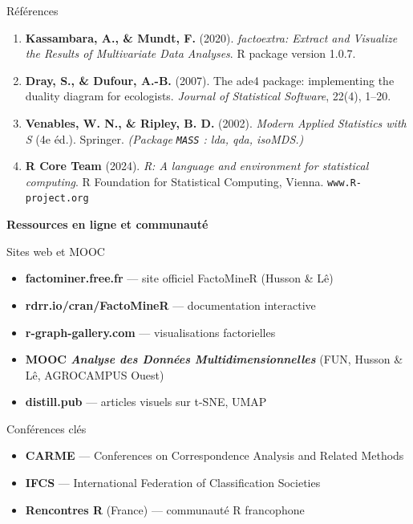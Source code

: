 \begin{frame}[allowframebreaks]{Références}
\begin{enumerate}
  \item \textbf{Kassambara, A., \& Mundt, F.} (2020).
        \textit{factoextra: Extract and Visualize the Results of Multivariate
        Data Analyses}. R package version 1.0.7.

  \item \textbf{Dray, S., \& Dufour, A.-B.} (2007).
        The ade4 package: implementing the duality diagram for ecologists.
        \textit{Journal of Statistical Software}, 22(4), 1--20.

  \item \textbf{Venables, W. N., \& Ripley, B. D.} (2002).
        \textit{Modern Applied Statistics with S} (4e éd.). Springer.
        \emph{(Package \texttt{MASS} : lda, qda, isoMDS.)}

  \item \textbf{R Core Team} (2024).
        \textit{R: A language and environment for statistical computing}.
        R Foundation for Statistical Computing, Vienna.
        \texttt{www.R-project.org}
\end{enumerate}

\framebreak

\textbf{\large Ressources en ligne et communauté}

\vspace{0.3cm}

\begin{block}{Sites web et MOOC}
\footnotesize
\begin{itemize}
  \item \textbf{factominer.free.fr} — site officiel FactoMineR (Husson \& Lê)
  \item \textbf{rdrr.io/cran/FactoMineR} — documentation interactive
  \item \textbf{r-graph-gallery.com} — visualisations factorielles
  \item \textbf{MOOC \emph{Analyse des Données Multidimensionnelles}}
        (FUN, Husson \& Lê, AGROCAMPUS Ouest)
  \item \textbf{distill.pub} — articles visuels sur t-SNE, UMAP
\end{itemize}
\end{block}

\vspace{0.3cm}

\begin{block}{Conférences clés}
\footnotesize
\begin{itemize}
  \item \textbf{CARME} — Conferences on Correspondence Analysis and Related Methods
  \item \textbf{IFCS} — International Federation of Classification Societies
  \item \textbf{Rencontres R} (France) — communauté R francophone
\end{itemize}
\end{block}

\end{frame}
